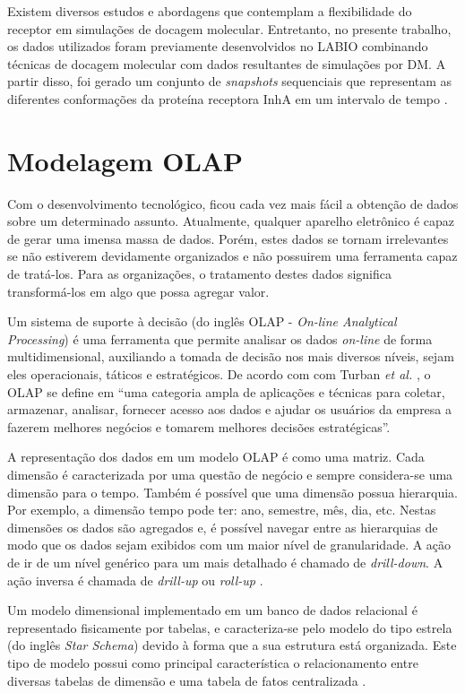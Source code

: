 Existem diversos estudos e abordagens que contemplam a flexibilidade do receptor em simulações de docagem molecular. Entretanto, no presente trabalho, os dados utilizados foram previamente desenvolvidos no LABIO combinando técnicas de docagem molecular com dados resultantes de simulações por DM. A partir disso, foi gerado um conjunto de \emph{snapshots} sequenciais que representam as diferentes conformações da proteína receptora InhA em um intervalo de tempo \cite{kar11}.

\section{Modelagem OLAP}

Com o desenvolvimento tecnológico, ficou cada vez mais fácil a obtenção de dados sobre um determinado assunto. Atualmente, qualquer aparelho eletrônico é capaz de gerar uma imensa massa de dados. Porém, estes dados se tornam irrelevantes se não estiverem devidamente organizados e não possuirem uma ferramenta capaz de tratá-los. Para as organizações, o tratamento destes dados significa transformá-los em algo que possa agregar valor.

Um sistema de suporte à decisão (do inglês OLAP - \emph{On-line Analytical Processing}) é uma ferramenta que permite analisar os dados \emph{on-line} de forma multidimensional, auxiliando a tomada de decisão nos mais diversos níveis, sejam eles operacionais, táticos e estratégicos. De acordo com com Turban \emph{et al.} \cite{TUR05}, o OLAP se define em “uma categoria ampla de aplicações e técnicas para coletar, armazenar, analisar, fornecer acesso aos dados e ajudar os usuários da empresa a fazerem melhores negócios e tomarem melhores decisões estratégicas”. 

A representação dos dados em um modelo OLAP é como uma matriz. Cada dimensão é caracterizada por uma questão de negócio e sempre considera-se uma dimensão para o tempo. Também é possível que uma dimensão possua hierarquia. Por exemplo, a dimensão tempo pode ter: ano, semestre, mês, dia, etc. Nestas dimensões os dados são agregados e, é possível navegar entre as hierarquias de modo que os dados sejam exibidos com um maior nível de granularidade. A ação de ir de um nível genérico para um mais detalhado é chamado de \emph{drill-down}. A ação inversa é chamada de \emph{drill-up} ou \emph{roll-up} \cite{KIM13}.

Um modelo dimensional implementado em um banco de dados relacional é representado fisicamente por tabelas, e caracteriza-se pelo modelo do tipo estrela (do inglês \emph{Star Schema}) devido à forma que a sua estrutura está organizada. Este tipo de modelo possui como principal característica o relacionamento entre diversas tabelas de dimensão e uma tabela de fatos centralizada \cite{KIM13}.

